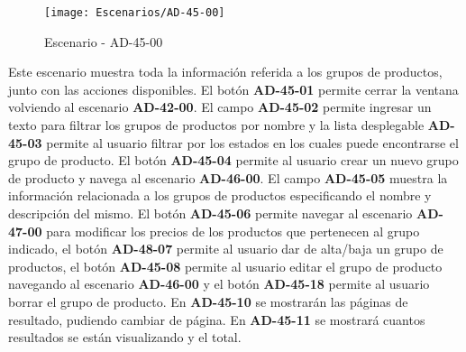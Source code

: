 \begin{figure}[H]
\centering
\texttt{[image: Escenarios/AD-45-00]}
\caption{Escenario - AD-45-00}
\label{fig:AD-45-00}
\end{figure}


Este escenario muestra toda la información referida a los grupos de productos, junto con las acciones disponibles.
El botón \textbf{AD-45-01} permite cerrar la ventana volviendo al escenario \textbf{AD-42-00}. El campo \textbf{AD-45-02} permite ingresar un texto para filtrar los grupos de productos por nombre y la lista desplegable \textbf{AD-45-03} permite al usuario filtrar por los estados en los cuales puede encontrarse el grupo de producto. El botón \textbf{AD-45-04} permite al usuario crear un nuevo grupo de producto y navega al escenario \textbf{AD-46-00}.
El campo \textbf{AD-45-05} muestra la información relacionada a los grupos de productos especificando el nombre y descripción del mismo. El botón \textbf{AD-45-06} permite navegar al escenario \textbf{AD-47-00} para modificar los precios de los productos que pertenecen al grupo indicado, el botón \textbf{AD-48-07} permite al usuario dar de alta/baja un grupo de productos, el botón \textbf{AD-45-08} permite al usuario editar el grupo de producto navegando al escenario \textbf{AD-46-00} y el botón \textbf{AD-45-18} permite al usuario borrar el grupo de producto. 
En \textbf{AD-45-10} se mostrarán las páginas de resultado, pudiendo cambiar de página. En \textbf{AD-45-11} se mostrará cuantos resultados se están visualizando y el total.

\clearpage
